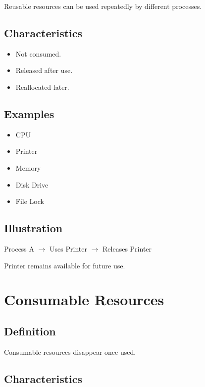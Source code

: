 Reusable resources can be used repeatedly by different processes.

\subsection{Characteristics}

\begin{itemize}
\item Not consumed.
\item Released after use.
\item Reallocated later.
\end{itemize}

\subsection{Examples}

\begin{itemize}
\item CPU
\item Printer
\item Memory
\item Disk Drive
\item File Lock
\end{itemize}

\subsection{Illustration}

\begin{center}
Process A $\rightarrow$ Uses Printer $\rightarrow$ Releases Printer
\end{center}

Printer remains available for future use.

\section{Consumable Resources}

\subsection{Definition}

Consumable resources disappear once used.

\subsection{Characteristics}


